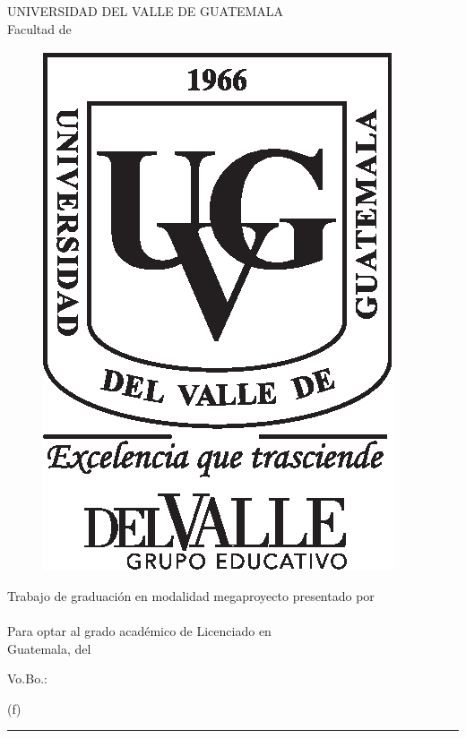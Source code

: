 \documentclass[10pt, letterpaper]{report}
\begin{document}
\ifdefined\CAPcaratula
	\newpage
	\pagecolor{white}
	\color{black}
	\setcounter{page}{1}
	\thispagestyle{empty}
	\begin{center}
		\LARGE UNIVERSIDAD DEL VALLE DE GUATEMALA\\
		\LARGE Facultad de \uvgfacultad \\[0.75cm]
	\end{center}
	\begin{figure}[h]
		\begin{center}
		\includegraphics[height=5.5 cm]{plantilla/escudoUVGnegro.eps}
		\vspace{0.5in}
		\end{center}
	\end{figure}
	\begin{center}
		\LARGE \textbf{\titulotesis} 
		\vfill
		\vfill
		\Large Trabajo de graduación en modalidad megaproyecto presentado por \\
		\Large \nombreestudiante \\
		\Large Para optar al grado académico de Licenciado en \uvgcarrera \\
		\vfill
		\large Guatemala, \mesentrega del \anoentrega
	\end{center}
\fi

\ifdefined\CAPfirmas
	\newpage
	\thispagestyle{empty}
	\vspace*{0.5in}
	\large Vo.Bo.:\\[1cm]
	\begin{center}
		(f) \rule[1pt]{4 in}{1pt}\\
		\nombreasesor
	\end{center}
	\vspace{1in}
\end{document}
